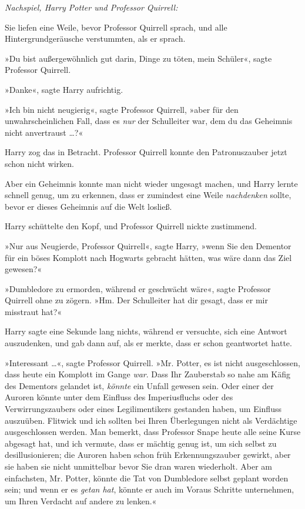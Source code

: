 {\emph{Nachspiel, Harry Potter und Professor Quirrell:}

Sie liefen eine Weile, bevor Professor Quirrell sprach, und alle Hintergrundgeräusche verstummten, als er sprach.

»Du bist außergewöhnlich gut darin, Dinge zu töten, mein Schüler«, sagte Professor Quirrell.

»Danke«, sagte Harry aufrichtig.

»Ich bin nicht neugierig«, sagte Professor Quirrell, »aber für den unwahrscheinlichen Fall, dass es \emph{nur} der Schulleiter war, dem du das Geheimnis nicht anvertraust …?«

Harry zog das in Betracht. Professor Quirrell konnte den Patronuszauber jetzt schon nicht wirken.

Aber ein Geheimnis konnte man nicht wieder ungesagt machen, und Harry lernte schnell genug, um zu erkennen, dass er zumindest eine Weile \emph{nachdenken} sollte, bevor er dieses Geheimnis auf die Welt losließ.

Harry schüttelte den Kopf, und Professor Quirrell nickte zustimmend.

»Nur aus Neugierde, Professor Quirrell«, sagte Harry, »wenn Sie den Dementor für ein böses Komplott nach Hogwarts gebracht hätten, was wäre dann das Ziel gewesen?«

»Dumbledore zu ermorden, während er geschwächt wäre«, sagte Professor Quirrell ohne zu zögern. »Hm. Der Schulleiter hat dir gesagt, dass er mir misstraut hat?«

Harry sagte eine Sekunde lang nichts, während er versuchte, sich eine Antwort auszudenken, und gab dann auf, als er merkte, dass er schon geantwortet hatte.

»Interessant …«, sagte Professor Quirrell. »Mr. Potter, es ist nicht ausgeschlossen, dass heute ein Komplott im Gange \emph{war}. Dass Ihr Zauberstab so nahe am Käfig des Dementors gelandet ist, \emph{könnte} ein Unfall gewesen sein. Oder einer der Auroren könnte unter dem Einfluss des Imperiusfluchs oder des Verwirrungszaubers oder eines Legilimentikers gestanden haben, um Einfluss auszuüben. Flitwick und ich sollten bei Ihren Überlegungen nicht als Verdächtige ausgeschlossen werden. Man bemerkt, dass Professor Snape heute alle seine Kurse abgesagt hat, und ich vermute, dass er mächtig genug ist, um sich selbst zu desillusionieren; die Auroren haben schon früh Erkennungszauber gewirkt, aber sie haben sie nicht unmittelbar bevor Sie dran waren wiederholt. Aber am einfachsten, Mr. Potter, könnte die Tat von Dumbledore selbst geplant worden sein; und wenn er es \emph{getan hat}, könnte er auch im Voraus Schritte unternehmen, um Ihren Verdacht auf andere zu lenken.«

}
